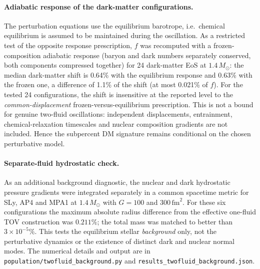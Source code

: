 \documentclass[11pt,a4paper]{article}
\newcommand{\Msun}{M_\odot}
\begin{document}
\paragraph{Adiabatic response of the dark-matter configurations.} The perturbation equations use the equilibrium barotrope, i.e.\ chemical equilibrium is assumed to be maintained during the oscillation. As a restricted test of the opposite response prescription, $f$ was recomputed with a frozen-composition adiabatic response (baryon and dark numbers separately conserved, both components compressed together) for 24 dark-matter EoS at $1.4\,\Msun$: the median dark-matter shift is 0.64\% with the equilibrium response and 0.63\% with the frozen one, a difference of 1.1\% of the shift (at most 0.021\% of $f$). For the tested 24 configurations, the shift is insensitive at the reported level to the \emph{common-displacement} frozen-versus-equilibrium prescription. This is not a bound for genuine two-fluid oscillations: independent displacements, entrainment, chemical-relaxation timescales and nuclear composition gradients are not included. Hence the subpercent DM signature remains conditional on the chosen perturbative model.
\paragraph{Separate-fluid hydrostatic check.} As an additional background diagnostic, the nuclear and dark hydrostatic pressure gradients were integrated separately in a common spacetime metric for SLy, AP4 and MPA1 at $1.4\,\Msun$ with $G=100$ and $300\,\mathrm{fm}^2$. For these six configurations the maximum absolute radius difference from the effective one-fluid TOV construction was $0.211\%$; the total mass was matched to better than $3\times10^{-5}\%$. This tests the equilibrium stellar \emph{background} only, not the perturbative dynamics or the existence of distinct dark and nuclear normal modes. The numerical details and output are in \texttt{population/twofluid\_background.py} and \texttt{results\_twofluid\_background.json}.\par
\end{document}
